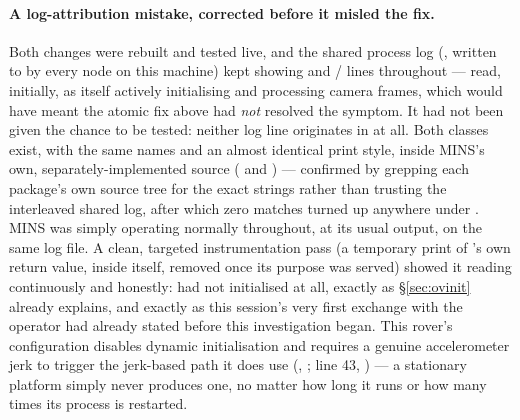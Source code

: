 \paragraph{A log-attribution mistake, corrected before it misled the fix.}
Both changes were rebuilt and tested live, and the shared process log
(, written to by every node on this
machine) kept showing  and
/ lines throughout — read, initially, as 
itself actively initialising and processing camera frames, which would
have meant the atomic fix above had \emph{not} resolved the symptom. It
had not been given the chance to be tested: neither log line originates in
 at all. Both classes exist, with the same names and an
almost identical print style, inside MINS's own, separately-implemented
source ( and
) —
confirmed by grepping each package's own source tree for the exact strings
rather than trusting the interleaved shared log, after which zero matches
turned up anywhere under . MINS was simply operating
normally throughout, at its usual output, on the same log file. A clean,
targeted instrumentation pass (a temporary print of 's
own return value, inside  itself, removed once
its purpose was served) showed it reading  continuously and
honestly:  had not initialised at all, exactly as
\S\ref{sec:ovinit} already explains, and exactly as this session's very
first exchange with the operator had already stated before this
investigation began. This rover's  configuration disables
dynamic initialisation and requires a genuine accelerometer jerk to
trigger the jerk-based path it does use
(,
; line 43, ) — a
stationary platform simply never produces one, no matter how long it runs
or how many times its process is restarted.

